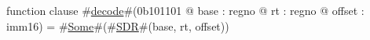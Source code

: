 function clause #\hyperref[zdecode]{decode}#(0b101101 @ base : regno @ rt : regno @ offset : imm16) =
      #\hyperref[zSome]{Some}#(#\hyperref[zSDR]{SDR}#(base, rt, offset))

